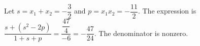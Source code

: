 Let $s=x_1+x_2=-\dfrac{3}{2}$ and $p=x_1x_2=-\dfrac{11}{2}$. The expression is $\dfrac{s+(s^2-2p)}{1+s+p} = \dfrac{\dfrac{47}{4}}{-6} = \boxed{-\dfrac{47}{24}}$. The denominator is nonzero.
